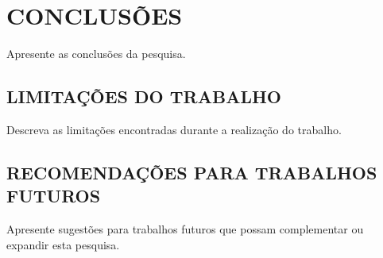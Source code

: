 \chapter{CONCLUSÕES} \label{conclusao}

Apresente as conclusões da pesquisa.

\section{LIMITAÇÕES DO TRABALHO}

Descreva as limitações encontradas durante a realização do trabalho.

\section{RECOMENDAÇÕES PARA TRABALHOS FUTUROS}

Apresente sugestões para trabalhos futuros que possam complementar ou expandir esta pesquisa.
